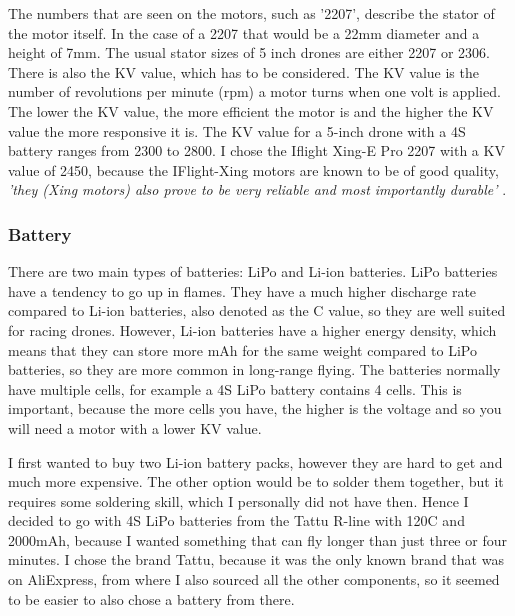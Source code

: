 \documentclass[svgnames]{article}
\begin{document}
	The numbers that are seen on the motors, such as '2207', describe the stator of the motor itself. In the case of a 2207 that would be a 22mm diameter and a height of 7mm. The usual stator sizes of 5 inch drones are either 2207 or 2306. There is also the KV value, which has to be considered. The KV value is the number of revolutions per minute (rpm) a motor turns when one volt is applied. The lower the KV value, the more efficient the motor is and the higher the KV value the more responsive it is. The KV value for a 5-inch drone with a 4S battery ranges from 2300 to 2800. I chose the Iflight Xing-E Pro 2207\cite{xingepro} with a KV value of 2450, because the IFlight-Xing motors are known to be of good quality, \textit{'they (Xing motors) also prove to be very reliable and most importantly durable'} \textcite{xingreview}. 


	
	\subsubsection{Battery}
	There are two main types of batteries: \gls{LiPo} and \gls{Li-ion} batteries. \gls{LiPo} batteries have a tendency to go up in flames. They have a much higher discharge rate compared to \gls{Li-ion} batteries, also denoted as the C value, so they are well suited for racing drones. However, \gls{Li-ion} batteries have a higher energy density, which means that they can store more mAh for the same weight compared to \gls{LiPo} batteries, so they are more common in long-range flying. The batteries normally have multiple cells, for example a 4S \gls{LiPo} battery contains 4 cells. This is important, because the more cells you have, the higher is the voltage and so you will need a motor with a lower KV value. 
	 
	I first wanted to buy two \gls{Li-ion} battery packs, however they are hard to get and much more expensive. The other option would be to solder them together, but it requires some soldering skill, which I personally did not have then. Hence I decided to go with 4S \gls{LiPo} batteries from the Tattu R-line with 120C and 2000mAh\cite{tattu}, because I wanted something that can fly longer than just three or four minutes. I chose the brand Tattu, because it was the only known brand that was on AliExpress, from where I also sourced all the other components, so it seemed to be easier to also chose a battery from there. 
	
\end{document}
